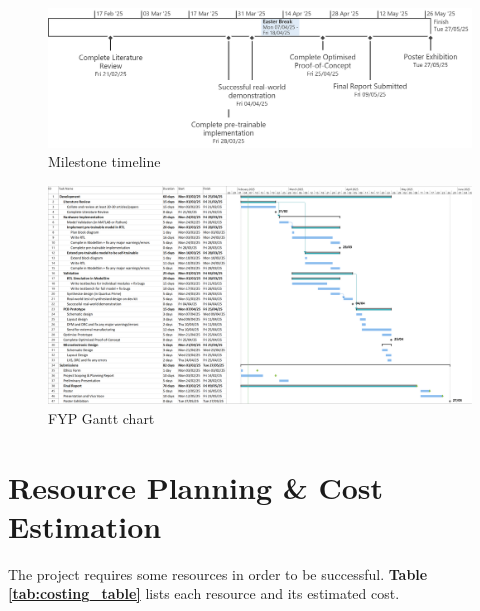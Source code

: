 \documentclass{article}
\begin{document}
\begin{figure}[!ht]
    \centering
    \includegraphics[width=\linewidth]{./figures/timeline.png}
    \caption{Milestone timeline}
    \label{fig:timeline}
\end{figure}

\begin{landscape}

\begin{figure}[!ht]
    \centering
    \includegraphics[width=\linewidth]{./figures/gantt_chart_low_detail.png}
    \caption{FYP Gantt chart}
    \label{fig:gantt_chart}
\end{figure}

\end{landscape}

\section{Resource Planning \& Cost Estimation}
The project requires some resources in order to be successful. \textbf{Table \ref{tab:costing_table}} lists each resource and its estimated cost.
\end{document}
